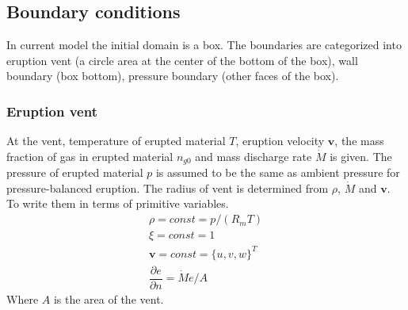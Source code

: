\documentclass[10pt,a4paper]{article}
\begin{document}
\subsection{Boundary conditions}
In current model the initial domain is a box. The boundaries are categorized into eruption vent (a circle area at the center of the bottom of the box), wall boundary (box bottom), pressure boundary (other faces of the box).

\subsubsection{Eruption vent}
At the vent, temperature of erupted material $T$, eruption velocity $\textbf{v}$,  the mass fraction of gas in erupted material $n_{g0}$ and mass discharge rate $\dot M$ is given. The pressure of erupted material $p$ is assumed to be the same as ambient pressure for pressure-balanced eruption. The radius of vent is determined from $\rho$, $\dot M$ and $\textbf{v}$. To write them in terms of primitive variables. 
\begin{eqnarray}
\rho =const = p/(R_m T) \label{eq:19} \\
\xi=const=1 \\
\textbf{v} = const =\{u,v,w\}^T\\
\dfrac{\partial e}{\partial n}=\dot M e /A \label{eq:22}
\end{eqnarray} 
Where $A$ is the area of the vent.
\end{document}
